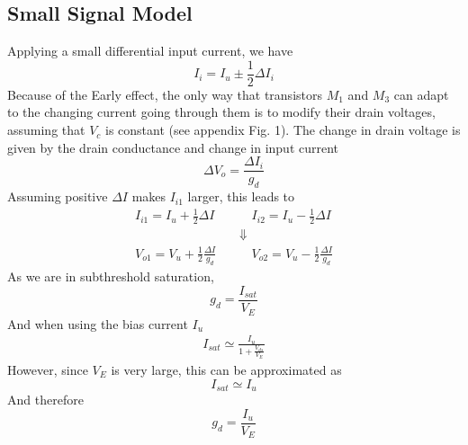 \subsection{Small Signal Model}
Applying a small differential input current, we have
\begin{equation*}
    I_i = I_u \pm \frac{1}{2}\Delta I_{i}
\end{equation*}
Because of the Early effect, the only way that transistors \(M_1\) and \(M_3\) can adapt to the changing current going through them
is to modify their drain voltages, assuming that \(V_c\) is constant (see appendix Fig. 1). The change in drain voltage is given by the drain conductance and
change in input current
\begin{equation*}
    \Delta V_o = \frac{\Delta I_i}{g_d}
\end{equation*}
Assuming positive \(\Delta I\) makes \(I_{i1}\) larger, this leads to
\begin{align*}
    I_{i1} = I_u+\frac{1}{2}\Delta I \quad & \quad I_{i2} = I_u-\frac{1}{2}\Delta I \\
                                           &\Downarrow \\
    V_{o1} = V_u+\frac{1}{2}\frac{\Delta I}{g_d} \quad & \quad V_{o2} = V_u-\frac{1}{2}\frac{\Delta I}{g_d} 
\end{align*}
As we are in subthreshold saturation, 
\begin{equation*}
    g_d = \frac{I_{sat}}{V_E}
\end{equation*}
And when using the bias current \(I_u\)
\begin{align*}
    I_{sat} \simeq \frac{I_u}{1+\frac{V_{ds}}{V_E}}
\end{align*}
However, since \(V_E\) is very large, this can be approximated as
\begin{equation*}
    I_{sat} \simeq I_u
\end{equation*}
And therefore
\begin{equation*}
    g_d = \frac{I_u}{V_E}
\end{equation*}

